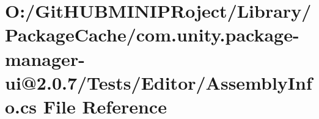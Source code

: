 \hypertarget{com_8unity_8package-manager-ui_0D2_80_87_2_tests_2_editor_2_assembly_info_8cs}{}\section{O\+:/\+Git\+H\+U\+B\+M\+I\+N\+I\+P\+Roject/\+Library/\+Package\+Cache/com.unity.\+package-\/manager-\/ui@2.0.7/\+Tests/\+Editor/\+Assembly\+Info.cs File Reference}
\label{com_8unity_8package-manager-ui_0D2_80_87_2_tests_2_editor_2_assembly_info_8cs}
